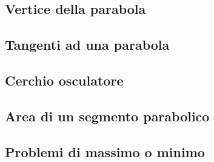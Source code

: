 \subsection{Vertice della parabola}
\label{subsec:insnum_vertice_parabola}


\subsection{Tangenti ad una parabola}
\label{subsec:insnum_tangenti_parabola}


\subsection{Cerchio osculatore}
\label{subsec:insnum_cerchio_osculatore}


\subsection{Area di un segmento parabolico}
\label{subsec:insnum_segmento_parabolico}


\subsection{Problemi di massimo o minimo}
\label{subsec:insnum_massimo_minimo}







































